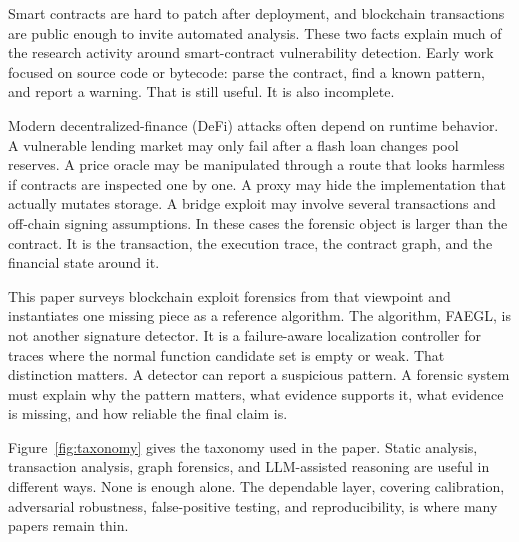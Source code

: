 \documentclass[conference]{IEEEtran}
\begin{document}
Smart contracts are hard to patch after deployment, and blockchain transactions are public enough to invite automated analysis. These two facts explain much of the research activity around smart-contract vulnerability detection. Early work focused on source code or bytecode: parse the contract, find a known pattern, and report a warning. That is still useful. It is also incomplete.

Modern decentralized-finance (DeFi) attacks often depend on runtime behavior. A vulnerable lending market may only fail after a flash loan changes pool reserves. A price oracle may be manipulated through a route that looks harmless if contracts are inspected one by one. A proxy may hide the implementation that actually mutates storage. A bridge exploit may involve several transactions and off-chain signing assumptions. In these cases the forensic object is larger than the contract. It is the transaction, the execution trace, the contract graph, and the financial state around it.

This paper surveys blockchain exploit forensics from that viewpoint and instantiates one missing piece as a reference algorithm. The algorithm, FAEGL, is not another signature detector. It is a failure-aware localization controller for traces where the normal function candidate set is empty or weak. That distinction matters. A detector can report a suspicious pattern. A forensic system must explain why the pattern matters, what evidence supports it, what evidence is missing, and how reliable the final claim is.

Figure~\ref{fig:taxonomy} gives the taxonomy used in the paper. Static analysis, transaction analysis, graph forensics, and LLM-assisted reasoning are useful in different ways. None is enough alone. The dependable layer, covering calibration, adversarial robustness, false-positive testing, and reproducibility, is where many papers remain thin.
\end{document}
